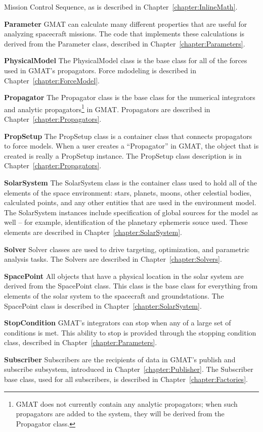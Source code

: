 \begin{description}
Mission Control Sequence, as is described in Chapter~\ref{chapter:InlineMath}.
\item \textbf{Parameter} GMAT can calculate many different properties that are useful for analyzing
spacecraft missions.  The code that implements these calculations is derived from the Parameter
class, described in Chapter~\ref{chapter:Parameters}.
\item \textbf{PhysicalModel} The PhysicalModel class is the base class for all of the forces used
in GMAT's propagators.  Force mdodeling is described in Chapter~\ref{chapter:ForceModel}.
\item \textbf{Propagator} The Propagator class is the base class for the numerical integrators and
analytic propagators\footnote{GMAT does not currently contain any analytic propagators; when such
propagators are added to the system, they will be derived from the Propagator class.} in GMAT. 
Propagators are described in Chapter~\ref{chapter:Propagators}.
\item \textbf{PropSetup} The PropSetup class is a container class that connects propagators to
force models.  When a user creates a ``Propagator'' in GMAT, the object that is created is really a
PropSetup instance.  The PropSetup class description is in Chapter~\ref{chapter:Propagators}.
\item \textbf{SolarSystem} The SolarSystem class is the container class used to hold all of the
elements of the space environment: stars, planets, moons, other celestial bodies, calculated
points, and any other entities that are used in the environment model.  The SolarSystem instances
include specification of global sources for the model as well -- for example, identification of the
planetary ephemeris souce used.  These elements are described in Chapter~\ref{chapter:SolarSystem}.
\item \textbf{Solver} Solver classes are used to drive targeting, optimization, and parametric
analysis tasks.  The Solvers are described in Chapter~\ref{chapter:Solvers}.
\item \textbf{SpacePoint} All objects that have a physical location in the solar system are derived
from the SpacePoint class.  This class is the base class for everything from elements of the solar
system to the spacecraft and groundstations.  The SpacePoint class is described in
Chapter~\ref{chapter:SolarSystem}.
\item \textbf{StopCondition} GMAT's integrators can stop when any of a large set of conditions is
met.  This ability to stop is provided through the stopping condition class, described in
Chapter~\ref{chapter:Parameters}.
\item \textbf{Subscriber} Subscribers are the recipients of data in GMAT's publish and subscribe
subsystem, introduced in Chapter~\ref{chapter:Publisher}.  The Subscriber base class, used for all
subscribers, is described in Chapter~\ref{chapter:Factories}.
\end{description}

